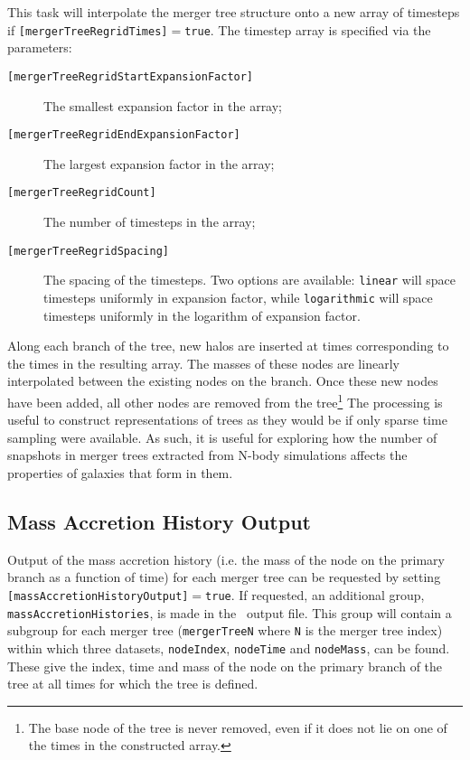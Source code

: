 This task will interpolate the merger tree structure onto a new array of timesteps if {\tt [mergerTreeRegridTimes]}$=${\tt true}. The timestep array is specified via the parameters:
\begin{description}
\item[{\tt [mergerTreeRegridStartExpansionFactor]}] The smallest expansion factor in the array;
\item[{\tt [mergerTreeRegridEndExpansionFactor]}] The largest expansion factor in the array;
\item[{\tt [mergerTreeRegridCount]}] The number of timesteps in the array;
\item[{\tt [mergerTreeRegridSpacing]}] The spacing of the timesteps. Two options are available: {\tt linear} will space timesteps uniformly in expansion factor, while {\tt logarithmic} will space timesteps uniformly in the logarithm of expansion factor.
\end{description}
Along each branch of the tree, new halos are inserted at times corresponding to the times in the resulting array. The masses of these nodes are linearly interpolated between the existing nodes on the branch. Once these new nodes have been added, all other nodes are removed from the tree\footnote{The base node of the tree is never removed, even if it does not lie on one of the times in the constructed array.} The processing is useful to construct representations of trees as they would be if only sparse time sampling were available. As such, it is useful for exploring how the number of snapshots in merger trees extracted from N-body simulations affects the properties of galaxies that form in them.

\subsection{Mass Accretion History Output}

Output of the mass accretion history (i.e. the mass of the \gls{node} on the primary branch as a function of time) for each merger tree can be requested by setting {\tt [massAccretionHistoryOutput]}$=${\tt true}. If requested, an additional group, {\tt massAccretionHistories}, is made in the \glc\ output file. This group will contain a subgroup for each merger tree ({\tt mergerTreeN} where {\tt N} is the merger tree index) within which three datasets, {\tt nodeIndex}, {\tt nodeTime} and {\tt nodeMass}, can be found. These give the index, time and mass of the \gls{node} on the primary branch of the tree at all times for which the tree is defined.

